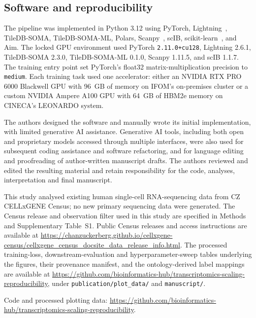 \documentclass[pdflatex,sn-nature]{sn-jnl}%
\theoremstyle{thmstyleone}%
\theoremstyle{thmstyletwo}%
\theoremstyle{thmstylethree}%
\begin{document}
\subsection{Software and reproducibility}

The pipeline was implemented in Python 3.12 using PyTorch, Lightning~\cite{Lightning}, TileDB-SOMA, TileDB-SOMA-ML, Polars, Scanpy~\cite{Wolf2018}, scIB, scikit-learn~\cite{scikit-learn}, and Aim.
The locked GPU environment used PyTorch \texttt{2.11.0+cu128}, Lightning 2.6.1, TileDB-SOMA 2.3.0, TileDB-SOMA-ML 0.1.0, Scanpy 1.11.5, and scIB 1.1.7.
The training entry point set PyTorch's float32 matrix-multiplication precision to \texttt{medium}.
Each training task used one accelerator: either an NVIDIA RTX PRO 6000 Blackwell GPU with 96~GB of memory on IFOM's on-premises cluster or a custom NVIDIA Ampere A100 GPU with 64~GB of HBM2e memory on CINECA's LEONARDO system.

The authors designed the software and manually wrote its initial implementation, with limited generative AI assistance.
Generative AI tools, including both open and proprietary models accessed through multiple interfaces, were also used for subsequent coding assistance and software refactoring, and for language editing and proofreading of author-written manuscript drafts.
The authors reviewed and edited the resulting material and retain responsibility for the code, analyses, interpretation and final manuscript.

\backmatter


This study analysed existing human single-cell RNA-sequencing data from CZ CELLxGENE Census; no new primary sequencing data were generated.
The Census release and observation filter used in this study are specified in Methods and Supplementary Table~S1.
Public Census releases and access instructions are available at \url{https://chanzuckerberg.github.io/cellxgene-census/cellxgene_census_docsite_data_release_info.html}.
The processed training-loss, downstream-evaluation and hyperparameter-sweep tables underlying the figures, their provenance manifest, and the ontology-derived label mappings are available at \url{https://github.com/bioinformatics-hub/transcriptomics-scaling-reproducibility}, under \texttt{publication/plot\_data/} and \texttt{manuscript/}.


Code and processed plotting data: \url{https://github.com/bioinformatics-hub/transcriptomics-scaling-reproducibility}.
\end{document}
